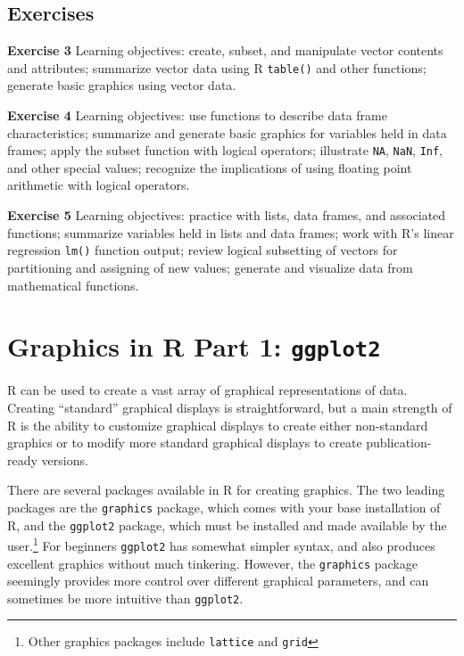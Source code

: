 \documentclass[
]{krantz}
\begin{document}
\hypertarget{exChapter4}{%
\section{Exercises}\label{exChapter4}}

\textbf{Exercise 3} Learning objectives: create, subset, and manipulate vector contents and attributes; summarize vector data using R \texttt{table()} and other functions; generate basic graphics using vector data.

\textbf{Exercise 4} Learning objectives: use functions to describe data frame characteristics; summarize and generate basic graphics for variables held in data frames; apply the subset function with logical operators; illustrate \texttt{NA}, \texttt{NaN}, \texttt{Inf}, and other special values; recognize the implications of using floating point arithmetic with logical operators.

\textbf{Exercise 5} Learning objectives: practice with lists, data frames, and associated functions; summarize variables held in lists and data frames; work with R's linear regression \texttt{lm()} function output; review logical subsetting of vectors for partitioning and assigning of new values; generate and visualize data from mathematical functions.

\hypertarget{ggplot2}{%
\chapter{\texorpdfstring{Graphics in R Part 1: \texttt{ggplot2}}{Graphics in R Part 1: ggplot2}}\label{ggplot2}}

R can be used to create a vast array of graphical representations of data. Creating ``standard'' graphical displays is straightforward, but a main strength of R is the ability to customize graphical displays to create either non-standard graphics or to modify more standard graphical displays to create publication-ready versions.

There are several packages available in R for creating graphics. The two leading packages are the \texttt{graphics} package, which comes with your base installation of R, and the \texttt{ggplot2} package, which must be installed and made available by the user.\footnote{Other graphics packages include \texttt{lattice} and \texttt{grid}} For beginners \texttt{ggplot2} has somewhat simpler syntax, and also produces excellent graphics without much tinkering. However, the \texttt{graphics} package seemingly provides more control over different graphical parameters, and can sometimes be more intuitive than \texttt{ggplot2}.
\end{document}
